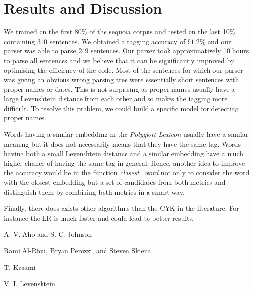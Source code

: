 \documentclass[10pt,twocolumn,letterpaper]{article}
\begin{document}
\section{Results and Discussion}
We trained on the first 80\% of the sequoia corpus and tested on the last 10\% containing 310 sentences. We obtained a tagging accuracy of $91.2\%$ and our parser was able to parse 249 sentences. Our parser took approximatively 10 hours to parse all sentences and we believe that it can be significantly improved by optimising the efficiency of the code. Most of the sentences for which our parser was giving an obvious wrong parsing tree were essentially short sentences with proper names or dates. This is not surprising as proper names usually have a large Levenshtein distance from each other and so makes the tagging more difficult. To resolve this problem, we could build a specific model for detecting proper names.\par
Words having a similar embedding in the \textit{Polyglott Lexicon} usually have a similar meaning but it does not necessarily means that they have the same tag. Words having both a small Levenshtein distance and a similar embedding have a much higher chance of having the same tag in general. Hence, another idea to improve the accuracy would be in the function \textit{closest\_word} not only to consider the word with the closest embedding but a set of candidates from both metrics and distinguish them by combining both metrics in a smart way.\par
Finally, there does exists other algorithms than the CYK in the literature. For instance the LR \cite{1} is much faster and could lead to better results.





\begin{thebibliography}{4}



A. V. Aho and S. C. Johnson

Rami Al-Rfou, Bryan Perozzi, and Steven Skiena

T. Kasami

V. I. Levenshtein
 

\end{thebibliography}
\end{document}
